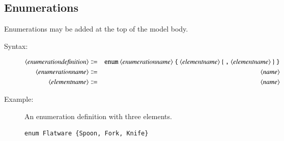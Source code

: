 \documentclass[a4paper,titlepage,oneside,final]{scrreprt} %
\begin{document}
\subsection{Enumerations}
Enumerations  may be added at the top of
the model body.
\begin{description}
\item[Syntax:]
\begin{eqnarray*}
\langle\mathit{enumerationdefinition}\rangle &\Coloneqq&
\verb+enum+~\langle\mathit{enumerationname}\rangle~\verb+{+~
\langle\mathit{elementname}\rangle~\{~\verb+,+~\langle\mathit{elementname}\rangle~\}~\verb+}+\\
\langle\mathit{enumerationname}\rangle &\Coloneqq&
\langle\mathit{name}\rangle\\
\langle\mathit{elementname}\rangle &\Coloneqq&
\langle\mathit{name}\rangle
\end{eqnarray*}
\item[Example:] An enumeration definition with three elements.
\begin{verbatim}
enum Flatware {Spoon, Fork, Knife}
\end{verbatim}
\end{description}
\end{document}
